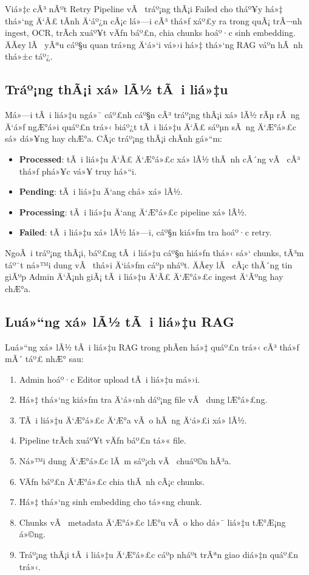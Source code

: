 ﻿\documentclass[12pt,a4paper]{report}
\begin{document}
Viá»‡c cÃ³ nÃºt Retry Pipeline vÃ  tráº¡ng thÃ¡i Failed cho tháº¥y há»‡ thá»‘ng Ä‘Ã£ tÃ­nh Ä‘áº¿n cÃ¡c lá»—i cÃ³ thá»ƒ xáº£y ra trong quÃ¡ trÃ¬nh ingest, OCR, trÃ­ch xuáº¥t vÄƒn báº£n, chia chunks hoáº·c sinh embedding. ÄÃ¢y lÃ  yÃªu cáº§u quan trá»ng Ä‘á»‘i vá»›i há»‡ thá»‘ng RAG váº­n hÃ nh thá»±c táº¿.

\subsection{Tráº¡ng thÃ¡i xá»­ lÃ½ tÃ i liá»‡u}

Má»—i tÃ i liá»‡u ngá»¯ cáº£nh cáº§n cÃ³ tráº¡ng thÃ¡i xá»­ lÃ½ rÃµ rÃ ng Ä‘á»ƒ ngÆ°á»i quáº£n trá»‹ biáº¿t tÃ i liá»‡u Ä‘Ã£ sáºµn sÃ ng Ä‘Æ°á»£c sá»­ dá»¥ng hay chÆ°a. CÃ¡c tráº¡ng thÃ¡i chÃ­nh gá»“m:

\begin{itemize}
    \item \textbf{Processed}: tÃ i liá»‡u Ä‘Ã£ Ä‘Æ°á»£c xá»­ lÃ½ thÃ nh cÃ´ng vÃ  cÃ³ thá»ƒ phá»¥c vá»¥ truy há»“i.
    \item \textbf{Pending}: tÃ i liá»‡u Ä‘ang chá» xá»­ lÃ½.
    \item \textbf{Processing}: tÃ i liá»‡u Ä‘ang Ä‘Æ°á»£c pipeline xá»­ lÃ½.
    \item \textbf{Failed}: tÃ i liá»‡u xá»­ lÃ½ lá»—i, cáº§n kiá»ƒm tra hoáº·c retry.
\end{itemize}

NgoÃ i tráº¡ng thÃ¡i, báº£ng tÃ i liá»‡u cáº§n hiá»ƒn thá»‹ sá»‘ chunks, tÃ³m táº¯t ná»™i dung vÃ  thá»i Ä‘iá»ƒm cáº­p nháº­t. ÄÃ¢y lÃ  cÃ¡c thÃ´ng tin giÃºp Admin Ä‘Ã¡nh giÃ¡ tÃ i liá»‡u Ä‘Ã£ Ä‘Æ°á»£c ingest Ä‘Ãºng hay chÆ°a.

\subsection{Luá»“ng xá»­ lÃ½ tÃ i liá»‡u RAG}

Luá»“ng xá»­ lÃ½ tÃ i liá»‡u RAG trong phÃ¢n há»‡ quáº£n trá»‹ cÃ³ thá»ƒ mÃ´ táº£ nhÆ° sau:

\begin{enumerate}
    \item Admin hoáº·c Editor upload tÃ i liá»‡u má»›i.
    \item Há»‡ thá»‘ng kiá»ƒm tra Ä‘á»‹nh dáº¡ng file vÃ  dung lÆ°á»£ng.
    \item TÃ i liá»‡u Ä‘Æ°á»£c Ä‘Æ°a vÃ o hÃ ng Ä‘á»£i xá»­ lÃ½.
    \item Pipeline trÃ­ch xuáº¥t vÄƒn báº£n tá»« file.
    \item Ná»™i dung Ä‘Æ°á»£c lÃ m sáº¡ch vÃ  chuáº©n hÃ³a.
    \item VÄƒn báº£n Ä‘Æ°á»£c chia thÃ nh cÃ¡c chunks.
    \item Há»‡ thá»‘ng sinh embedding cho tá»«ng chunk.
    \item Chunks vÃ  metadata Ä‘Æ°á»£c lÆ°u vÃ o kho dá»¯ liá»‡u tÆ°Æ¡ng á»©ng.
    \item Tráº¡ng thÃ¡i tÃ i liá»‡u Ä‘Æ°á»£c cáº­p nháº­t trÃªn giao diá»‡n quáº£n trá»‹.
\end{enumerate}
\end{document}
